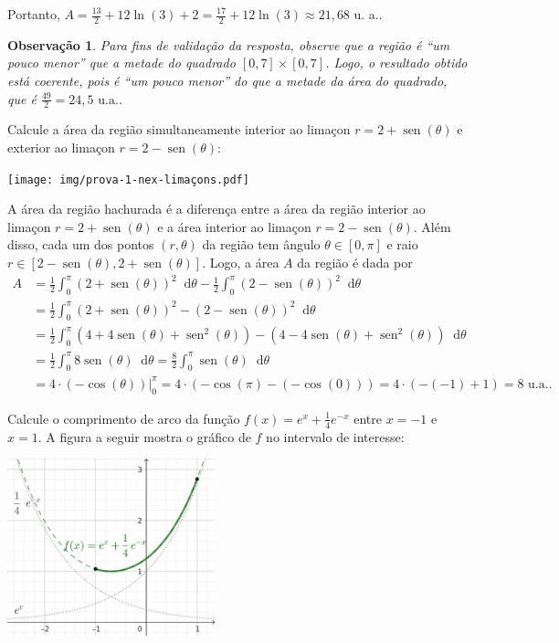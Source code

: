 \documentclass[12pt,a4paper]{article}
\newtheorem*{note}{Observação}
\newcommand*\diff{\mathop{}\!\mathrm{d}}
\newcommand*\sen{\operatorname{sen}}
\begin{document}
\begin{ExerciseList}
Portanto, $A = \frac{13}{2} + 12 \ln(3) + 2 = \frac{17}{2} + 12\ln(3) \approx 21,68$ u. a..

\begin{note}
  Para fins de validação da resposta, observe que a região é ``um pouco menor'' que a metade do quadrado $[0, 7] \times [0, 7]$. Logo, o resultado obtido está coerente, pois é ``um pouco menor'' do que a metade da área do quadrado, que é $\frac{49}{2} = 24,5 \text{ u.a.}$.
\end{note}


\Exercise[title={2,0}]
Calcule a área da região simultaneamente interior ao limaçon \(r = 2 + \sen(\theta)\) e exterior ao limaçon \(r = 2 - \sen(\theta)\):

\texttt{[image: img/prova-1-nex-limaçons.pdf]}

\Answer A área da região hachurada é a diferença entre a área da região interior ao limaçon \(r = 2 + \sen(\theta)\) e a área interior ao limaçon \(r = 2 - \sen(\theta)\). Além disso, cada um dos pontos \((r, \theta)\) da região tem ângulo
$\theta \in [0, \pi]$ e raio $r \in [2 - \sen(\theta), 2 + \sen(\theta)]$. Logo, a área $A$ da região é dada por
\begin{align*}
  A
  & = \frac{1}{2}\int_0^\pi \left(2 + \sen(\theta)\right)^2 \diff\theta
      -
      \frac{1}{2}\int_0^\pi \left(2 - \sen(\theta)\right)^2 \diff\theta \\
  & = \frac{1}{2}\int_0^\pi \left(2 + \sen(\theta)\right)^2 - \left(2 - \sen(\theta)\right)^2 \diff\theta \\
  & = \frac{1}{2}\int_0^\pi \left(4 + 4\sen(\theta) + \sen^2(\theta)\right) - \left(4 - 4\sen(\theta) + \sen^2(\theta)\right) \diff\theta \\
  & = \frac{1}{2}\int_0^\pi 8\sen(\theta) \diff\theta
    = \frac{8}{2}\int_0^\pi \sen(\theta) \diff\theta \\
  & = 4 \cdot \left( -\cos(\theta) \right)\big\rvert_0^\pi
    = 4 \cdot \left( -\cos(\pi) - (-\cos(0))\right)
    = 4 \cdot \left(-(-1) + 1 \right)
    = 8 \text{ u.a.}.
\end{align*}


\Exercise[title={2,0}]
Calcule o comprimento de arco da função $f(x) = e^x + \frac{1}{4}e^{-x}$ entre $x=-1$ e $x=1$.
\Answer A figura a seguir mostra o gráfico de $f$ no intervalo de interesse:

\begin{center}
\includegraphics[width=6.0cm]{img/prova-1-nex-comprimento-de-arco.pdf}
\end{center}


\end{ExerciseList}
\end{document}
